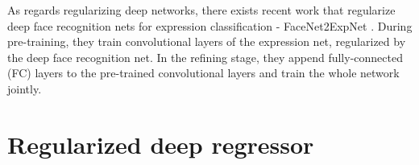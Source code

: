 \documentclass{article}
\begin{document}
As regards regularizing deep networks, there exists recent work that regularize deep face recognition nets for expression classification - FaceNet2ExpNet \cite{ding2016facenet2expnet}. During pre-training, they train convolutional layers of the expression net, regularized by the deep face recognition net. In the refining stage, they append fully-connected (FC) layers to the pre-trained convolutional layers and train the whole network jointly.

\section{Regularized deep regressor}
\label{Sec:reg}

\end{document}
